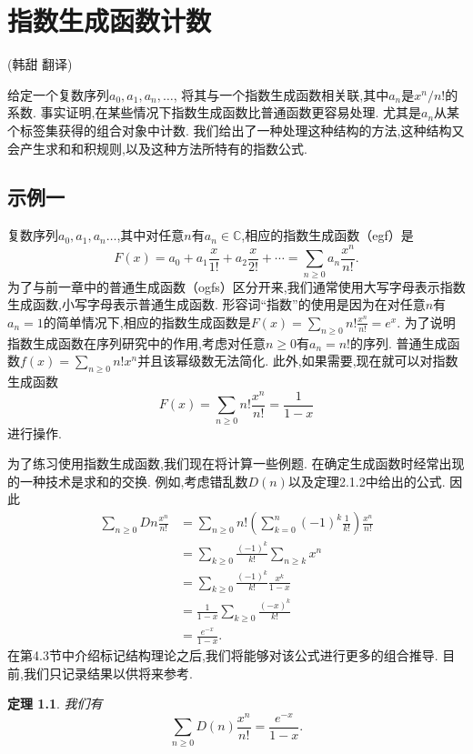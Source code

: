 \documentclass[a4paper,12pt]{ctexbook}
\newtheorem{theorem}[lemma]{\hspace{2em}定理}%
\begin{document}
\setcounter{chapter}{3}


\chapter{指数生成函数计数}
	\begin{center}
		(韩甜 \quad 翻译)
	\end{center}


给定一个复数序列\(a_{0},a_{1},a_{n}, \dots\), 将其与一个指数生成函数相关联,其中$a_{n}$是\(x^{n}/n!\)的系数.  事实证明,在某些情况下指数生成函数比普通函数更容易处理.  尤其是$a_{n}$从某个标签集获得的组合对象中计数.  我们给出了一种处理这种结构的方法,这种结构又会产生求和和积规则,以及这种方法所特有的指数公式.  
\section{示例一}
复数序列$a_{0},a_{1},a_{n} \dots$,其中对任意$n$有$a_{n} \in \mathbb C$,相应的{\kaishu 指数生成函数}（egf）是
\[
F(x)=a_{0}+a_{1}\frac{x}{1!}+a_{2}\frac{x}{2!}+\cdots =\sum_{n\ge0}a_{n}\frac{x^{n}}{n!}. 
\]
为了与前一章中的普通生成函数（ogfs）区分开来,我们通常使用大写字母表示指数生成函数,小写字母表示普通生成函数.  形容词“指数”的使用是因为在对任意$n$有$a_{n}=1$的简单情况下,相应的指数生成函数是$F(x)=\sum_{n\ge0}n!\frac{x^{n}}{n!}=e^x$.  
为了说明指数生成函数在序列研究中的作用,考虑对任意$n\ge0$有$a_{n}=n!$的序列.  普通生成函数$f(x)=\sum_{n\ge0}n!x^n$并且该幂级数无法简化.  此外,如果需要,现在就可以对指数生成函数$$F(x)=\sum_{n\ge0}n!\frac{x^{n}}{n!}=\frac{1}{1-x}$$进行操作.  

为了练习使用指数生成函数,我们现在将计算一些例题.  在确定生成函数时经常出现的一种技术是求和的交换.  例如,考虑错乱数$D(n)$以及定理2.1.2中给出的公式.  因此
\begin{align*}
\sum_{n\ge0}D{n}\frac{x^{n}}{n!}
&=\sum_{n\ge0}n!\left(\sum_{k=0}^n(-1)^k\frac{1}{k!}\right)\frac{x^{n}}{n!}\\
&=\sum_{k\ge0}\frac{(-1)^k}{k!}\sum_{n\ge k}x^{n}\\
&=\sum_{k\ge0}\frac{(-1)^k}{k!}\frac{x^k}{1-x}\\
&=\frac{1}{1-x}\sum_{k\ge0}\frac{(-x)^k}{k!}\\
&=\frac{e^{-x}}{1-x}. 
\end{align*}
在第4.3节中介绍标记结构理论之后,我们将能够对该公式进行更多的组合推导.  目前,我们只记录结果以供将来参考.  
\begin{theorem}
	我们有
	$$
	\sum_{n\ge0}D(n)\frac{x^{n}}{n!}=\frac{e^{-x}}{1-x}. 
	$$
\end{theorem}
\end{document}
